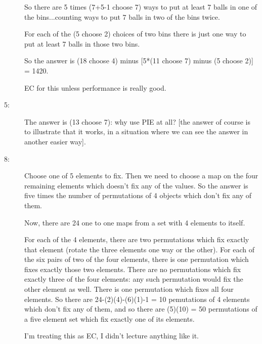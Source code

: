 \documentclass[12pt]{article}
\begin{document}
\begin{description}
So there are 5 times (7+5-1 choose 7)  ways to put at least 7 balls in one of the bins...counting ways to put 7 balls in two of the bins twice.

For each of the (5 choose 2) choices of two bins there is just one way to put at least 7 balls in those two bins.

So the answer is (18 choose 4) minus [5*(11 choose 7) minus (5 choose 2)] = 1420.

EC for this unless performance is really good.


\item[5:]  The answer is (13 choose 7):  why use PIE at all?  [the answer of course is to illustrate that it works, in a situation where we can see the answer in another easier way].

\item[8:]  Choose one of 5 elements to fix.  Then we need to choose a map on the four remaining elements which doesn't fix any of the values.  So the answer is five times the number of permutations of 4 objects which don't fix any of them.

Now, there are 24 one to one maps from a set with 4 elements to itself.

For each of the 4 elements, there are two permutations which fix exactly that element (rotate the three elements one way or the other).  For each of the six pairs of two of the four elements, there is one permutation which fixes exactly those two elements.  There are no permutations which fix exactly three of the four elements:  any such permutation would fix the other element as well.  There is one permutation which fixes all four elements.  So there are 24-(2)(4)-(6)(1)-1 = 10 pemutations of 4 elements which don't fix any of them, and so there are (5)(10) = 50 permutations of a five element set which fix exactly one of its elements.

I'm treating this as EC, I didn't lecture anything like it.

\end{description}
\end{document}
